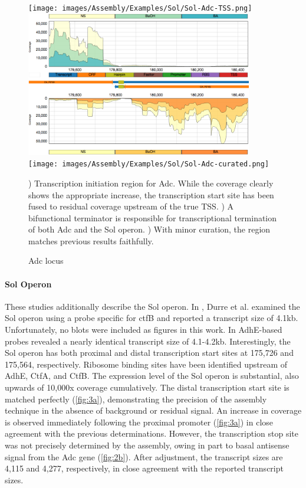 \begin{figure}
\small
{\texttt{[image: images/Assembly/Examples/Sol/Sol-Adc-TSS.png]}
\label{fig:2a}}
{\includegraphics[width=\textwidth,height=2.5in]{images/Assembly/Examples/Sol/Sol-bifunctional-terminator.png}
\label{fig:2b}}
{\texttt{[image: images/Assembly/Examples/Sol/Sol-Adc-curated.png]}
\label{fig:2c}}
\caption{Adc locus}
) Transcription initiation region for Adc. While the coverage clearly shows the appropriate increase, the transcription start site has been fused to residual coverage upstream of the true TSS. ) A bifunctional terminator is responsible for transcriptional termination of both Adc and the Sol operon. ) With minor curation, the region matches previous results faithfully.
\label{fig2}
\end{figure}


\paragraph{Sol Operon}
These studies additionally describe the Sol operon. In \cite{65}, Durre et al. examined the Sol operon using a probe specific for ctfB and reported a transcript size of 4.1kb. Unfortunately, no blots were included as figures in this work. In \cite{63} AdhE-based probes revealed a nearly identical transcript size of 4.1-4.2kb. Interestingly, the Sol operon has both proximal and distal transcription start sites at 175,726 and 175,564, respectively\cite{62,63}. Ribosome binding sites have been identified upstream of AdhE, CtfA, and CtfB\cite{63}. The expression level of the Sol operon is substantial, also upwards of 10,000x coverage cumulatively. The distal transcription start site is matched perfectly (\ref{fig:3a}), demonstrating the precision of the assembly technique in the absence of background or residual signal. An increase in coverage is observed immediately following the proximal promoter (\ref{fig:3a}) in close agreement with the previous determinations\cite{62,63}. However, the transcription stop site was not precisely determined by the assembly, owing in part to basal antisense signal from the Adc gene (\ref{fig:2b}). After adjustment, the transcript sizes are 4,115 and 4,277, respectively, in close agreement with the reported transcript sizes\cite{63,65}.

